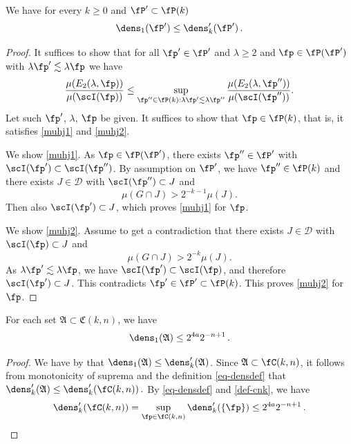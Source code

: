 \begin{lemma}
    \label{dens-compare}
    \leanok
    We have for every $k\ge 0$ and $\fP'\subset \fP(k)$
\begin{equation}
    \dens_1(\fP')\le \dens_k'(\fP')\, .
\end{equation}
\end{lemma}
\begin{proof}
\leanok
It suffices to show that for all $\fp'\in \fP'$
and $\lambda\ge 2$ and $\fp\in \fP(\fP')$ with $\lambda \fp' \lesssim \lambda \fp$ we have
\begin{equation}
    \frac{\mu({E}_2(\lambda, \fp))}{\mu(\scI(\fp))}
    \le \sup_{\fp'' \in \fP(k): \lambda \fp' \lesssim \lambda \fp''}
    \frac{\mu({E}_2(\lambda, \fp''))}{\mu(\scI(\fp''))}.
\end{equation}
    Let such $\fp'$, $\lambda$, $\fp$ be given.
    It suffices to show that $\fp\in \fP(k)$,
    that is, it satisfies \eqref{muhj1}
    and \eqref{muhj2}.

We show \eqref{muhj1}.
 As $\fp\in \fP(\fP')$, there exists
$\fp''\in \fP'$ with $\scI(\fp')\subset \scI(\fp'')$. By assumption on $\fP'$, we have $\fp''\in \fP(k)$ and there exists
$J\in \mathcal{D}$ with
   $\scI(\fp'')\subset J$ and
   \begin{equation}
       \mu(G\cap J)>2^{-k-1} \mu(J).
   \end{equation}
Then also $\scI(\fp')\subset J$, which proves
\eqref{muhj1} for $\fp$.

We show \eqref{muhj2}. Assume to get a contradiction that
there exists $J\in \mathcal{D}$ with
   $\scI(\fp)\subset J$ and
   \begin{equation}\label{mugj}
       \mu(G\cap J)>2^{-k} \mu(J).
   \end{equation}
   As $\lambda\fp'\lesssim \lambda\fp$, we have $\scI(\fp')\subset \scI(\fp)$, and therefore
    $\scI(\fp')\subset J$. This contradicts
   $\fp'\in \fP'\subset \fP(k)$. This proves
\eqref{muhj2} for $\fp$.
\end{proof}

\begin{lemma}[C dens1]
    \label{C-dens1}
    \leanok
    For each set $\mathfrak{A} \subset \mathfrak{C}(k,n)$, we have
    $$
        \dens_1(\mathfrak{A}) \le 2^{4a}2^{-n+1}\,.
    $$
\end{lemma}

\begin{proof}
    \leanok
    We have by  that
    $\dens_1(\mathfrak{A}) \le \dens_k'(\mathfrak{A})$. Since $\mathfrak{A} \subset \fC(k,n)$, it follows from monotonicity of suprema and the definition \eqref{eq-densdef} that
    $
        \dens_k'(\mathfrak{A}) \le \dens_k'(\fC(k,n))\,.
    $
    By \eqref{eq-densdef} and \eqref{def-cnk}, we have
    $$
        \dens_k'(\fC(k,n)) = \sup_{\fp \in \fC(k,n)} \dens_k'(\{\fp\}) \le 2^{4a}2^{-n+1}\,.
    $$
\end{proof}

